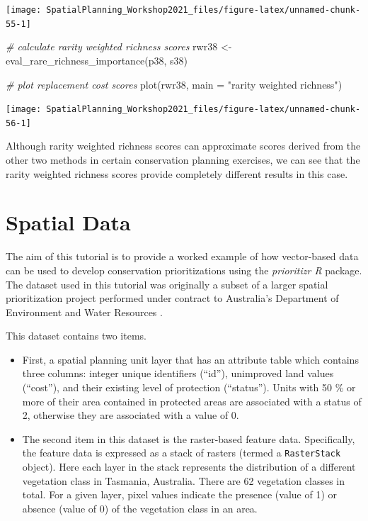\documentclass[
  12pt,
]{book}
\newenvironment{Shaded}{\begin{snugshade}}{\end{snugshade}}
\newcommand{\AttributeTok}[1]{\textcolor[rgb]{0.77,0.63,0.00}{#1}}
\newcommand{\CommentTok}[1]{\textcolor[rgb]{0.56,0.35,0.01}{\textit{#1}}}
\newcommand{\FunctionTok}[1]{\textcolor[rgb]{0.00,0.00,0.00}{#1}}
\newcommand{\NormalTok}[1]{#1}
\newcommand{\OtherTok}[1]{\textcolor[rgb]{0.56,0.35,0.01}{#1}}
\newcommand{\StringTok}[1]{\textcolor[rgb]{0.31,0.60,0.02}{#1}}
\begin{document}
\begin{center}\texttt{[image: SpatialPlanning\_Workshop2021\_files/figure-latex/unnamed-chunk-55-1]} \end{center}

\begin{Shaded}
\begin{Highlighting}[]
\CommentTok{\# calculate rarity weighted richness scores}
\NormalTok{rwr38 }\OtherTok{\textless{}{-}} \FunctionTok{eval\_rare\_richness\_importance}\NormalTok{(p38, s38)}

\CommentTok{\# plot replacement cost scores}
\FunctionTok{plot}\NormalTok{(rwr38, }\AttributeTok{main =} \StringTok{"rarity weighted richness"}\NormalTok{)}
\end{Highlighting}
\end{Shaded}

\begin{center}\texttt{[image: SpatialPlanning\_Workshop2021\_files/figure-latex/unnamed-chunk-56-1]} \end{center}

Although rarity weighted richness scores can approximate scores derived from the other two methods in certain conservation planning exercises, we can see that the rarity weighted richness scores provide completely different results in this case.

\hypertarget{data}{%
\chapter{Spatial Data}\label{data}}

The aim of this tutorial is to provide a worked example of how vector-based data can be used to develop conservation prioritizations using the \emph{prioritizr R} package. The dataset used in this tutorial was originally a subset of a larger spatial prioritization project performed under contract to Australia's Department of Environment and Water Resources \citep{r30}.

This dataset contains two items.

\begin{itemize}
\item
  First, a spatial planning unit layer that has an attribute table which contains three columns: integer unique identifiers (``id''), unimproved land values (``cost''), and their existing level of protection (``status''). Units with 50 \% or more of their area contained in protected areas are associated with a status of 2, otherwise they are associated with a value of 0.
\item
  The second item in this dataset is the raster-based feature data. Specifically, the feature data is expressed as a stack of rasters (termed a \texttt{RasterStack} object). Here each layer in the stack represents the distribution of a different vegetation class in Tasmania, Australia. There are 62 vegetation classes in total. For a given layer, pixel values indicate the presence (value of 1) or absence (value of 0) of the vegetation class in an area.
\end{itemize}
\end{document}
